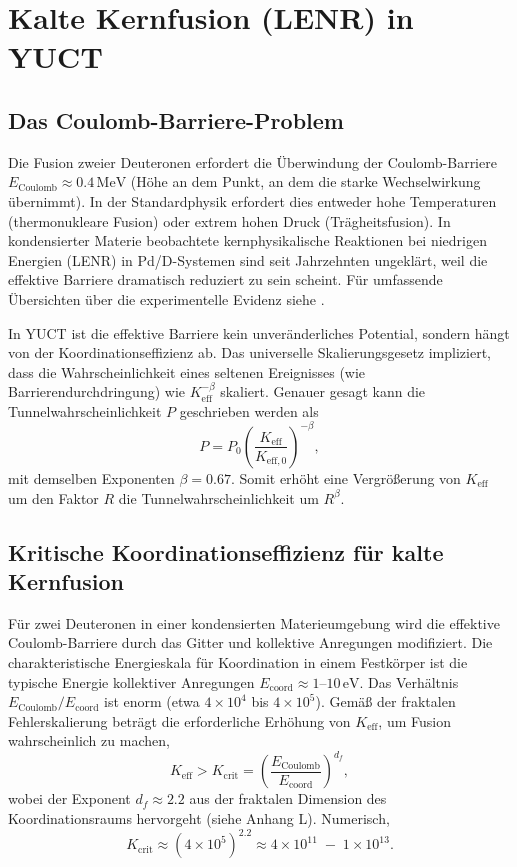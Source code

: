 \documentclass[12pt]{article}
\theoremstyle{remark}
\newcommand{\Keff}{K_{\mathrm{eff}}}
\newcommand{\Keffzero}{K_{\mathrm{eff},0}}
\newcommand{\df}{d_{\!f}}
\newcommand{\Kcrit}{K_{\mathrm{crit}}}
\begin{document}
	\section{Kalte Kernfusion (LENR) in YUCT}
	\label{sec:fusion}
	
	\subsection{Das Coulomb-Barriere-Problem}
	
	Die Fusion zweier Deuteronen erfordert die Überwindung der Coulomb-Barriere \(E_{\text{Coulomb}} \approx 0.4\,\text{MeV}\) (Höhe an dem Punkt, an dem die starke Wechselwirkung übernimmt). In der Standardphysik erfordert dies entweder hohe Temperaturen (thermonukleare Fusion) oder extrem hohen Druck (Trägheitsfusion). In kondensierter Materie beobachtete kernphysikalische Reaktionen bei niedrigen Energien (LENR) in Pd/D-Systemen sind seit Jahrzehnten ungeklärt, weil die effektive Barriere dramatisch reduziert zu sein scheint. Für umfassende Übersichten über die experimentelle Evidenz siehe \cite{Storms2014, Nagel2019}.
	
	In YUCT ist die effektive Barriere kein unveränderliches Potential, sondern hängt von der Koordinationseffizienz ab. Das universelle Skalierungsgesetz impliziert, dass die Wahrscheinlichkeit eines seltenen Ereignisses (wie Barrierendurchdringung) wie \(\Keff^{-\beta}\) skaliert. Genauer gesagt kann die Tunnelwahrscheinlichkeit \(P\) geschrieben werden als
	\begin{equation}
		P = P_0 \left( \frac{\Keff}{\Keffzero} \right)^{-\beta},
		\label{eq:tunnel}
	\end{equation}
	mit demselben Exponenten \(\beta = 0.67\). Somit erhöht eine Vergrößerung von \(\Keff\) um den Faktor \(R\) die Tunnelwahrscheinlichkeit um \(R^{\beta}\).
	
	\subsection{Kritische Koordinationseffizienz für kalte Kernfusion}
	
	Für zwei Deuteronen in einer kondensierten Materieumgebung wird die effektive Coulomb-Barriere durch das Gitter und kollektive Anregungen modifiziert. Die charakteristische Energieskala für Koordination in einem Festkörper ist die typische Energie kollektiver Anregungen \(E_{\mathrm{coord}} \approx 1\)–\(10\,\text{eV}\). Das Verhältnis \(E_{\text{Coulomb}}/E_{\mathrm{coord}}\) ist enorm (etwa \(4\times10^4\) bis \(4\times10^5\)). Gemäß der fraktalen Fehlerskalierung beträgt die erforderliche Erhöhung von \(\Keff\), um Fusion wahrscheinlich zu machen,
	\begin{equation}
		\Keff > \Kcrit = \left( \frac{E_{\text{Coulomb}}}{E_{\mathrm{coord}}} \right)^{\df},
		\label{eq:Kcrit}
	\end{equation}
	wobei der Exponent \(\df \approx 2.2\) aus der fraktalen Dimension des Koordinationsraums hervorgeht (siehe Anhang L). Numerisch,
	\[
	\Kcrit \approx (4\times10^5)^{2.2} \approx 4\times10^{11} \;-\; 1\times10^{13}.
	\]
	
\end{document}
